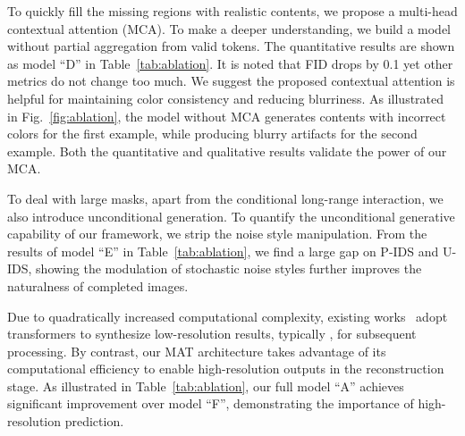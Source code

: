 \documentclass[10pt,twocolumn,letterpaper]{article}
\begin{document}
	
	\vspace{0.05in}
	 To quickly fill the missing regions with realistic contents, we propose a multi-head contextual attention (MCA). To make a deeper understanding, we build a model without partial aggregation from valid tokens. The quantitative results are shown as model ``D'' in Table~\ref{tab:ablation}. It is noted that FID drops by 0.1 yet other metrics do not change too much. We suggest the proposed contextual attention is helpful for maintaining color consistency and reducing blurriness. As illustrated in Fig.~\ref{fig:ablation}, the model without MCA generates contents with incorrect colors for the first example, while producing blurry artifacts for the second example. Both the quantitative and qualitative results validate the power of our MCA.
	
	\vspace{0.05in}
	 To deal with large masks, apart from the conditional long-range interaction, we also introduce unconditional generation. To quantify the unconditional generative capability of our framework, we strip the noise style manipulation. From the results of model ``E'' in Table~\ref{tab:ablation}, we find a large gap on P-IDS and U-IDS, showing the modulation of stochastic noise styles further improves the naturalness of completed images.
	
	\vspace{0.05in}
	 Due to quadratically increased computational complexity, existing works~\cite{wan2021high,zheng2021tfill,yu2021diverse} adopt transformers to synthesize low-resolution results, typically , for subsequent processing. By contrast, our MAT architecture takes advantage of its computational efficiency to enable high-resolution outputs in the reconstruction stage. As illustrated in Table~\ref{tab:ablation}, our full model ``A'' achieves significant improvement over model ``F'', demonstrating the importance of high-resolution prediction.
	
\end{document}
